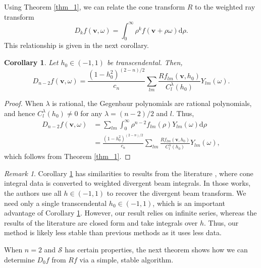 \documentclass[a4paper,12pt]{amsart}
\numberwithin{equation}{section}
\theoremstyle{plain}
\numberwithin{theorem}{section}
\newtheorem{corollary}[theorem]{Corollary}
\theoremstyle{definition}
\theoremstyle{remark}
\newtheorem{remark}[theorem]{Remark}
\theoremstyle{remark}
\theoremstyle{remark}
\newcommand{\s}{\mathcal S}
\newcommand{\vv}{{\mathbf{v}}}
\begin{document}
Using Theorem \ref{thm_1}, we can relate the cone transform $R$ to the weighted ray transform
\begin{equation} \label{eq:WeightedRayDef}
D_kf(\vv, \omega) = \int_0^\infty \rho^{k}  f(\vv + \rho \omega) \mathrm{d}\rho.
\end{equation}
This relationship is given in the next corollary.

\begin{corollary}\label{corr_1}
Let $h_0 \in (-1,1)$ be transcendental. Then,
\begin{equation}
\label{exp_1}
D_{n-2}f(\vv, \omega) = \frac{(1-h_0^2)^{(2-n)/2}}{c_n} \sum_{lm} \frac{Rf_{lm}(\vv, h_0)}{C^{\lambda}_l(h_0)} Y_{lm}(\omega).
\end{equation}
\end{corollary}

\begin{proof}
When $\lambda$ is rational, the Gegenbaur polynomials are rational polynomials, and hence $C^{\lambda}_l(h_0) \neq 0$ for any $\lambda = (n-2)/2$ and $l$. Thus,
\begin{equation}
\begin{split}
D_{n-2}f(\vv, \omega) &= \sum_{lm}\int_0^\infty \rho^{n-2} f_{lm}(\rho) Y_{lm}(\omega) \mathrm{d}\rho \\
&= \frac{(1-h_0^2)^{(2-n)/2}}{c_n} \sum_{lm} \frac{Rf_{lm}(\vv, h_0)}{C^{\lambda}_l(h_0)} Y_{lm}(\omega),
\end{split}
\end{equation}
which follows from Theorem \ref{thm_1}.
\end{proof}
\begin{remark}
Corollary \ref{corr_1} has similarities to results from the literature \cite{terzioglu2020exact,moon2025inversion,kuchment2017inversion}, where cone integral data is converted to weighted divergent beam integrals. In those works, the authors use all $h \in (-1,1)$ to recover the divergent beam transform. We need only a single transcendental $h_0 \in (-1,1)$, which is an important advantage of Corollary \ref{corr_1}. However, our result relies on infinite series, whereas the results of the literature are closed form and take integrals over $h$. Thus, our method is likely less stable than previous methods as it uses less data.
\end{remark}

When $n = 2$ and $\s$ has certain properties, the next theorem shows how we can determine $D_{0}f$ from $Rf$ via a simple, stable algorithm. 
\end{document}

